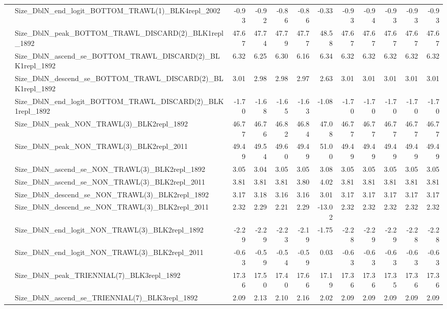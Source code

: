 \documentclass[
]{scrartcl}
\begin{document}
\begin{landscape}
\begin{longtable}{llrrrrrrrrrr}
 & Size\_DblN\_end\_logit\_BOTTOM\_TRAWL(1)\_BLK4repl\_2002 & -0.93 & -0.92 & -0.86 & -0.86 & -0.33 & -0.93 & -0.94 & -0.93 & -0.93 & -0.93 \\ 
 & Size\_DblN\_peak\_BOTTOM\_TRAWL\_DISCARD(2)\_BLK1repl\_1892 & 47.67 & 47.74 & 47.79 & 47.77 & 48.58 & 47.67 & 47.67 & 47.67 & 47.67 & 47.67 \\ 
 & Size\_DblN\_ascend\_se\_BOTTOM\_TRAWL\_DISCARD(2)\_BLK1repl\_1892 & 6.32 & 6.25 & 6.30 & 6.16 & 6.34 & 6.32 & 6.32 & 6.32 & 6.32 & 6.32 \\ 
 & Size\_DblN\_descend\_se\_BOTTOM\_TRAWL\_DISCARD(2)\_BLK1repl\_1892 & 3.01 & 2.98 & 2.98 & 2.97 & 2.63 & 3.01 & 3.01 & 3.01 & 3.01 & 3.01 \\ 
 & Size\_DblN\_end\_logit\_BOTTOM\_TRAWL\_DISCARD(2)\_BLK1repl\_1892 & -1.70 & -1.68 & -1.65 & -1.63 & -1.08 & -1.70 & -1.70 & -1.70 & -1.70 & -1.70 \\ 
 & Size\_DblN\_peak\_NON\_TRAWL(3)\_BLK2repl\_1892 & 46.77 & 46.76 & 46.82 & 46.84 & 47.08 & 46.77 & 46.77 & 46.77 & 46.77 & 46.77 \\ 
 & Size\_DblN\_peak\_NON\_TRAWL(3)\_BLK2repl\_2011 & 49.49 & 49.54 & 49.60 & 49.49 & 51.00 & 49.49 & 49.49 & 49.49 & 49.49 & 49.49 \\ 
 & Size\_DblN\_ascend\_se\_NON\_TRAWL(3)\_BLK2repl\_1892 & 3.05 & 3.04 & 3.05 & 3.05 & 3.08 & 3.05 & 3.05 & 3.05 & 3.05 & 3.05 \\ 
 & Size\_DblN\_ascend\_se\_NON\_TRAWL(3)\_BLK2repl\_2011 & 3.81 & 3.81 & 3.81 & 3.80 & 4.02 & 3.81 & 3.81 & 3.81 & 3.81 & 3.81 \\ 
 & Size\_DblN\_descend\_se\_NON\_TRAWL(3)\_BLK2repl\_1892 & 3.17 & 3.18 & 3.16 & 3.16 & 3.01 & 3.17 & 3.17 & 3.17 & 3.17 & 3.17 \\ 
 & Size\_DblN\_descend\_se\_NON\_TRAWL(3)\_BLK2repl\_2011 & 2.32 & 2.29 & 2.21 & 2.29 & -13.02 & 2.32 & 2.32 & 2.32 & 2.32 & 2.32 \\ 
 & Size\_DblN\_end\_logit\_NON\_TRAWL(3)\_BLK2repl\_1892 & -2.29 & -2.29 & -2.23 & -2.19 & -1.75 & -2.28 & -2.29 & -2.29 & -2.28 & -2.28 \\ 
 & Size\_DblN\_end\_logit\_NON\_TRAWL(3)\_BLK2repl\_2011 & -0.63 & -0.59 & -0.54 & -0.59 & 0.03 & -0.63 & -0.63 & -0.63 & -0.63 & -0.63 \\ 
 & Size\_DblN\_peak\_TRIENNIAL(7)\_BLK3repl\_1892 & 17.36 & 17.50 & 17.40 & 17.66 & 17.19 & 17.36 & 17.36 & 17.35 & 17.36 & 17.36 \\ 
 & Size\_DblN\_ascend\_se\_TRIENNIAL(7)\_BLK3repl\_1892 & 2.09 & 2.13 & 2.10 & 2.16 & 2.02 & 2.09 & 2.09 & 2.09 & 2.09 & 2.09 \\ 

\end{longtable}
\end{landscape}
\end{document}
